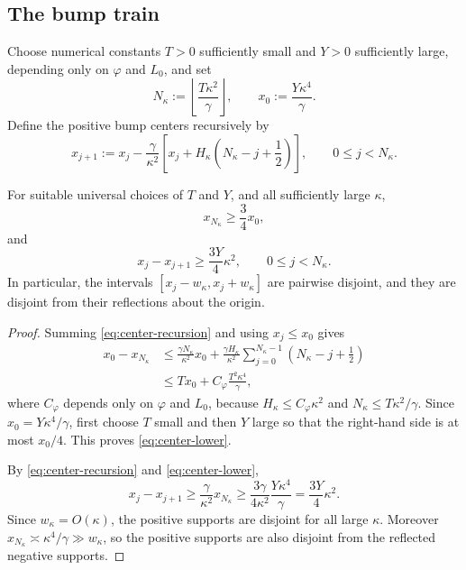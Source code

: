 \subsection{The bump train}

Choose numerical constants $T>0$ sufficiently small and $Y>0$ sufficiently large,
depending only on $\varphi$ and $L_0$, and set
\begin{equation}
\label{eq:bump-count-x0}
    N_\kappa:=\left\lfloor\frac{T\kappa^2}{\gamma}\right\rfloor,
    \qquad
    x_0:=\frac{Y\kappa^4}{\gamma}.
\end{equation}
Define the positive bump centers recursively by
\begin{equation}
\label{eq:center-recursion}
    x_{j+1}
    :=x_j-
    \frac{\gamma}{\kappa^2}
    \left[
        x_j+H_\kappa\left(N_\kappa-j+\frac12\right)
    \right],
    \qquad
    0\leq j<N_\kappa.
\end{equation}

\begin{lemma}
\label{lem:bump-centers}
For suitable universal choices of $T$ and $Y$, and all sufficiently large $\kappa$,
\begin{equation}
\label{eq:center-lower}
    x_{N_\kappa}\geq\frac34x_0,
\end{equation}
and
\begin{equation}
\label{eq:center-spacing}
    x_j-x_{j+1}\geq\frac{3Y}{4}\kappa^2,
    \qquad
    0\leq j<N_\kappa.
\end{equation}
In particular, the intervals $[x_j-w_\kappa,x_j+w_\kappa]$ are pairwise disjoint, and
they are disjoint from their reflections about the origin.
\end{lemma}

\begin{proof}
Summing \eqref{eq:center-recursion} and using $x_j\leq x_0$ gives
\begin{align*}
    x_0-x_{N_\kappa}
    &\leq
    \frac{\gamma N_\kappa}{\kappa^2}x_0
    +\frac{\gamma H_\kappa}{\kappa^2}
      \sum_{j=0}^{N_\kappa-1}
      \left(N_\kappa-j+\frac12\right)\\
    &\leq
    T x_0
    +C_\varphi\frac{T^2\kappa^4}{\gamma},
\end{align*}
where $C_\varphi$ depends only on $\varphi$ and $L_0$, because
$H_\kappa\leq C_\varphi\kappa^2$ and
$N_\kappa\leq T\kappa^2/\gamma$.  Since
$x_0=Y\kappa^4/\gamma$, first choose $T$ small and then $Y$ large so that the right-hand
side is at most $x_0/4$.  This proves \eqref{eq:center-lower}.

By \eqref{eq:center-recursion} and \eqref{eq:center-lower},
\[
    x_j-x_{j+1}
    \geq
    \frac{\gamma}{\kappa^2}x_{N_\kappa}
    \geq
    \frac{3\gamma}{4\kappa^2}\frac{Y\kappa^4}{\gamma}
    =\frac{3Y}{4}\kappa^2.
\]
Since $w_\kappa=O(\kappa)$, the positive supports are disjoint for all large $\kappa$.
Moreover $x_{N_\kappa}\asymp\kappa^4/\gamma\gg w_\kappa$, so the positive supports are
also disjoint from the reflected negative supports.
\end{proof}

